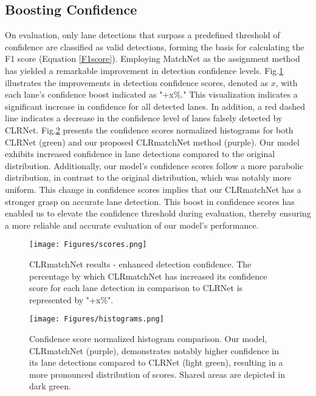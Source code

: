 \documentclass[10pt,twocolumn,letterpaper]{article}
\begin{document}
\subsection{Boosting Confidence}
On evaluation, only lane detections that surpass a predefined threshold of confidence are classified as valid detections, forming the basis for calculating the F1 score (Equation \ref{F1score}). Employing MatchNet as the assignment method has yielded a remarkable improvement in detection confidence levels. Fig.\ref{scores} illustrates the improvements in detection confidence scores, denoted as $x$, with each lane's confidence boost indicated as "+x\%." This visualization indicates a significant increase in confidence for all detected lanes. In addition, a red dashed line indicates a decrease in the confidence level of lanes falsely detected by CLRNet. Fig.\ref{histograms} presents the confidence scores normalized histograms for both CLRNet (green) and our proposed CLRmatchNet method (purple). Our model exhibits increased confidence in lane detections compared to the original distribution. Additionally, our model's confidence scores follow a more parabolic distribution, in contrast to the original distribution, which was notably more uniform. This change in confidence scores implies that our CLRmatchNet has a stronger grasp on accurate lane detection. This boost in confidence scores has enabled us to elevate the confidence threshold during evaluation, thereby ensuring a more reliable and accurate evaluation of our model's performance.
\begin{figure}[h]
\begin{center}
    \centering
    \texttt{[image: Figures/scores.png]}
\caption{CLRmatchNet results - enhanced detection confidence. The percentage by which CLRmatchNet has increased its confidence score for each lane detection in comparison to CLRNet is represented by "+x\%".}
\label{scores}
\end{center}
\end{figure}
\begin{figure}[h]
\begin{center}
    \centering
    \texttt{[image: Figures/histograms.png]}
\caption{Confidence score normalized histogram comparison. Our model, CLRmatchNet (purple), demonstrates notably higher confidence in its lane detections compared to CLRNet (light green), resulting in a more pronounced distribution of scores. Shared areas are depicted in dark green.}
\label{histograms}
\end{center}
\end{figure}
\end{document}
